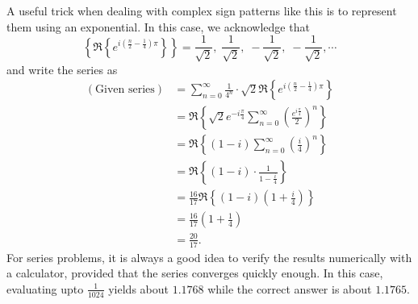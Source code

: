 \item

A useful trick when dealing with complex sign patterns like this is to represent them using an exponential.
In this case, we acknowledge that
\[
	\left\{ \Re \left\{ e^{i\left( \frac{n}{2} - \frac{1}{4} \right) \pi} \right\} \right\}
	= \frac{1}{\sqrt{2}},\; \frac{1}{\sqrt{2}},\; -\frac{1}{\sqrt{2}},\; -\frac{1}{\sqrt{2}}, \cdots
\]
and write the series as
\begin{align*}
	(\text{Given series})
	 & = \sum_{n=0}^\infty \frac{1}{4^n} \cdot \sqrt{2} \Re \left\{ e^{i\left( \frac{n}{2} - \frac{1}{4} \right) \pi} \right\} \\
	 & = \Re \left\{ \sqrt{2} e^{-i\frac{\pi}{4}} \sum_{n=0}^\infty {\left( \frac{e^{i\frac{\pi}{4}}}{2} \right)}^n \right\}   \\
	 & = \Re \left\{ (1 - i) \sum_{n=0}^\infty {\left( \frac{i}{4} \right)}^n \right\}                                         \\
	 & = \Re \left\{ (1 - i) \cdot \frac{1}{1 - \frac{i}{4}} \right\}                                                          \\
	 & = \frac{16}{17} \Re \left\{ (1 - i) \left( 1 + \frac{i}{4} \right) \right\}                                             \\
	 & = \frac{16}{17} \left( 1 + \frac{1}{4} \right)                                                                          \\
	 & = \frac{20}{17}.
\end{align*}
For series problems, it is always a good idea to verify the results numerically with a calculator, provided that the series converges quickly enough.
In this case, evaluating upto $\frac{1}{1024}$ yields about $1.1768$ while the correct answer is about $1.1765$.